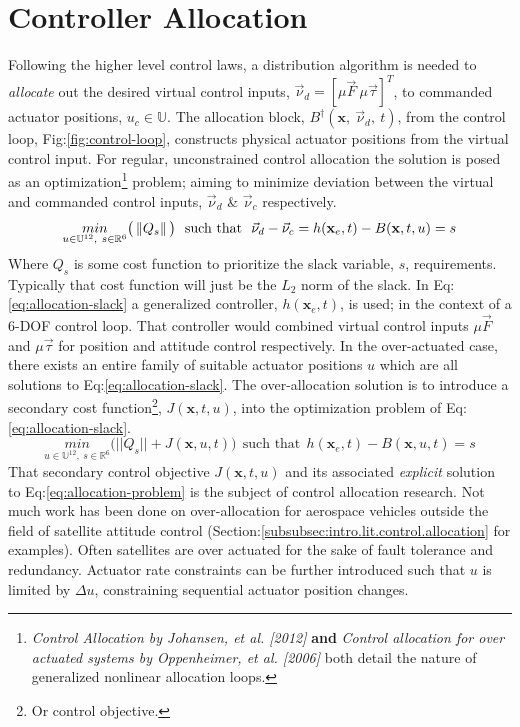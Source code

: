 {\section{Controller Allocation}
\label{sec:control.allocation}
Following the higher level control laws, a distribution algorithm is needed to \emph{allocate} out the desired virtual control inputs, $\vec{\nu}_d=[\mu\vec{F}~\mu\vec{\tau}]^T$, to commanded actuator positions, $u_c\in\mathbb{U}$. The allocation block, $B^\dagger(\mathbf{x},~\vec{\nu}_d,~t)$, from the control loop, Fig:\ref{fig:control-loop}, constructs physical actuator positions from the virtual control input. For regular, unconstrained control allocation the solution is posed as an optimization\footnote{\emph{Control Allocation by Johansen, et al. [2012]\cite{allocation}} \textbf{and} \emph{Control allocation for over actuated systems by Oppenheimer, et al. [2006]\cite{controlallocation}} both detail the nature of generalized nonlinear allocation loops.} problem; aiming to minimize deviation between the virtual and commanded control inputs, $\vec{\nu}_d$ \& $\vec{\nu}_c$ respectively.
\begin{equation}\label{eq:allocation-slack}
\underset{u\in\mathbb{U}^{12},~s\in\mathbb{R}^{6}}{min}\big(\left\lVert Q_s\right\rVert\big)~~\text{such that}~~\vec{\nu}_d-\vec{\nu}_c=h(\mathbf{x}_e,t)-B(\mathbf{x},t,u)=s
\end{equation}
Where $Q_s$ is some cost function to prioritize the slack variable, $s$, requirements. Typically that cost function will just be the $L_2$ norm of the slack. In Eq:\ref{eq:allocation-slack} a generalized controller, $h(\mathbf{x}_e,t)$, is used; in the context of a 6-DOF control loop. That controller would combined virtual control inputs $\mu\vec{F}$ and $\mu\vec{\tau}$ for position and attitude control respectively. In the over-actuated case, there exists an entire family of suitable actuator positions $u$ which are all solutions to Eq:\ref{eq:allocation-slack}. The over-allocation solution is to introduce a secondary cost function\footnote{Or control objective.}, $J(\mathbf{x},t,u)$, into the optimization problem of Eq:\ref{eq:allocation-slack}.
\begin{equation}\label{eq:allocation-problem}
\underset{u\in\mathbb{U}^{12},~s\in\mathbb{R}^{6}}{min}\big(||Q_s||+J(\mathbf{x},u,t)\big)~~\text{such that}~~h(\mathbf{x}_e,t)-B(\mathbf{x},u,t)=s
\end{equation}
That secondary control objective $J(\mathbf{x},t,u)$ and its associated \emph{explicit} solution to Eq:\ref{eq:allocation-problem} is the subject of control allocation research. Not much work has been done on over-allocation for aerospace vehicles outside the field of satellite attitude control (Section:\ref{subsubsec:intro.lit.control.allocation} for examples). Often satellites are over actuated for the sake of fault tolerance and redundancy\cite{FTCallocation,discreteFTC}. Actuator rate constraints can be further introduced such that $u$ is limited by $\Delta u$, constraining sequential actuator position changes.
}
